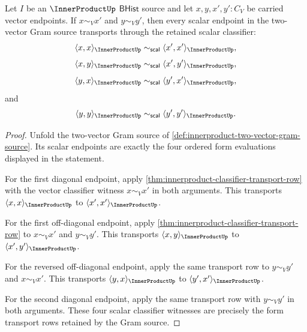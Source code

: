 \begin{theorem}
\label{thm:innerproduct-gram-carrier-transport}
Let $I$ be an $\InnerProductUp$ $\mathsf{BHist}$ source and let
$x,y,x',y':C_V$ be carried vector endpoints. If $x\sim_V x'$ and
$y\sim_V y'$, then every scalar endpoint in the two-vector Gram source
transports through the retained scalar classifier:
$$
\langle x,x\rangle_{\InnerProductUp}
\sim_{\mathsf{scal}}
\langle x',x'\rangle_{\InnerProductUp},
$$
$$
\langle x,y\rangle_{\InnerProductUp}
\sim_{\mathsf{scal}}
\langle x',y'\rangle_{\InnerProductUp},
$$
$$
\langle y,x\rangle_{\InnerProductUp}
\sim_{\mathsf{scal}}
\langle y',x'\rangle_{\InnerProductUp},
$$
and
$$
\langle y,y\rangle_{\InnerProductUp}
\sim_{\mathsf{scal}}
\langle y',y'\rangle_{\InnerProductUp}.
$$
\end{theorem}
\begin{proof}
Unfold the two-vector Gram source of
\autoref{def:innerproduct-two-vector-gram-source}. Its scalar endpoints are
exactly the four ordered form evaluations displayed in the statement.

For the first diagonal endpoint, apply
\autoref{thm:innerproduct-classifier-transport-row} with the vector
classifier witness $x\sim_V x'$ in both arguments. This transports
$\langle x,x\rangle_{\InnerProductUp}$ to
$\langle x',x'\rangle_{\InnerProductUp}$.

For the first off-diagonal endpoint, apply
\autoref{thm:innerproduct-classifier-transport-row} to $x\sim_V x'$ and
$y\sim_V y'$. This transports
$\langle x,y\rangle_{\InnerProductUp}$ to
$\langle x',y'\rangle_{\InnerProductUp}$.

For the reversed off-diagonal endpoint, apply the same transport row to
$y\sim_V y'$ and $x\sim_V x'$. This transports
$\langle y,x\rangle_{\InnerProductUp}$ to
$\langle y',x'\rangle_{\InnerProductUp}$.

For the second diagonal endpoint, apply the same transport row with
$y\sim_V y'$ in both arguments. These four scalar classifier witnesses are
precisely the form transport rows retained by the Gram source.
\end{proof}

